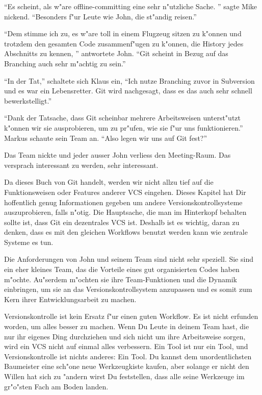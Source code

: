 \begin{trenches}
``Es scheint, als w"are offline-committing eine sehr n"utzliche Sache. '' sagte Mike nickend. ``Besonders f"ur Leute wie John, die st"andig reisen.''

``Dem stimme ich zu, es w"are toll in einem Flugzeug sitzen zu k"onnen und trotzdem den gesamten Code zusammenf"ugen zu k"onnen, die History jedes Abschnitts zu kennen, '' antwortete John. ``Git scheint in Bezug auf das Branching auch sehr m"achtig zu sein.''

``In der Tat,'' schaltete sich Klaus ein, ``Ich nutze Branching zuvor in Subversion und es war ein Lebensretter. Git wird nachgesagt, dass es das auch sehr schnell bewerkstelligt.''

``Dank der Tatsache, dass Git scheinbar mehrere Arbeitsweisen unterst"utzt k"onnen wir sie ausprobieren, um zu pr"ufen, wie sie f"ur uns funktionieren.'' Markus schaute sein Team an. ``Also legen wir uns auf Git fest?''

Das Team nickte und jeder ausser John verliess den Meeting-Raum. Das versprach interessant zu werden, sehr interessant.
\end{trenches}

Da dieses Buch von Git handelt, werden wir nicht allzu tief auf die Funktionsweisen oder Features anderer VCS eingehen. Dieses Kapitel hat Dir hoffentlich genug Informationen gegeben um andere Versionskontrollsysteme auszuprobieren, falls  n"otig. Die Hauptsache, die man im Hinterkopf behalten sollte ist, dass Git ein dezentrales VCS ist. Deshalb ist es wichtig, daran zu denken, dass es mit den gleichen Workflows benutzt werden kann wie zentrale Systeme es tun.

Die Anforderungen von John und seinem Team sind nicht sehr speziell. Sie sind ein eher kleines Team, das die Vorteile eines gut organisierten Codes haben m"ochte. Au"serdem m"ochten sie ihre Team-Funktionen und die Dynamik einbringen, um sie an das Versionskontrollsystem anzupassen und es somit zum Kern ihrer Entwicklungsarbeit zu machen.

Versionskontrolle ist kein Ersatz f"ur einen guten Workflow. Es ist nicht erfunden worden, um alles besser zu machen. Wenn Du Leute in deinem Team hast, die nur ihr eigenes Ding durchziehen und sich nicht um ihre Arbeitsweise sorgen, wird ein VCS nicht auf einmal alles verbessern. Ein Tool ist nur ein Tool, und Versionskontrolle ist nichts anderes: Ein Tool. Du kannst dem unordentlichsten Baumeister eine sch"one neue Werkzeugkiste kaufen, aber solange er nicht den Willen hat sich zu "andern wirst Du feststellen, dass alle seine Werkzeuge im gr"o"sten Fach am Boden landen. 

